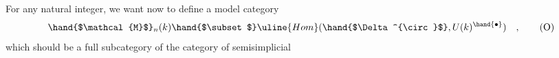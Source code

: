 For any natural integer, we want now to define a model category
\[ \hand{$\mathcal{M}$}_n(k) \hand{$\subset$} \uline{Hom}(\hand{$\Delta^{\circ}$}, U(k)^\hand{\bullet}) \quad , \tag{O} \]
which should be a full subcategory of the category of semisimplicial


